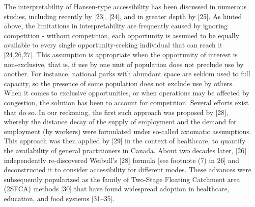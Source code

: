 \documentclass[10pt,letterpaper]{article}
\begin{document}
The interpretability of Hansen-type accessibility has been discussed in
numerous studies, including recently by {[}23{]}, {[}24{]}, and in
greater depth by {[}25{]}. As hinted above, the limitations in
interpretability are frequently caused by ignoring competition - without
competition, each opportunity is assumed to be equally available to
every single opportunity-seeking individual that can reach it
{[}24,26,27{]}. This assumption is appropriate when the opportunity of
interest is non-exclusive, that is, if use by one unit of population
does not preclude use by another. For instance, national parks with
abundant space are seldom used to full capacity, so the presence of some
population does not exclude use by others. When it comes to exclusive
opportunities, or when operations may be affected by congestion, the
solution has been to account for competition. Several efforts exist that
do so. In our reckoning, the first such approach was proposed by
{[}28{]}, whereby the distance decay of the supply of employment and the
demand for employment (by workers) were formulated under so-called
axiomatic assumptions. This approach was then applied by {[}29{]} in the
context of healthcare, to quantify the availability of general
practitioners in Canada. About two decades later, {[}26{]} independently
re-discovered Weibull's {[}28{]} formula {[}see footnote (7) in 26{]}
and deconstructed it to consider accessibility for different modes.
These advances were subsequently popularized as the family of Two-Stage
Floating Catchment area (2SFCA) methods {[}30{]} that have found
widespread adoption in healthcare, education, and food systems
{[}31--35{]}.
\end{document}
